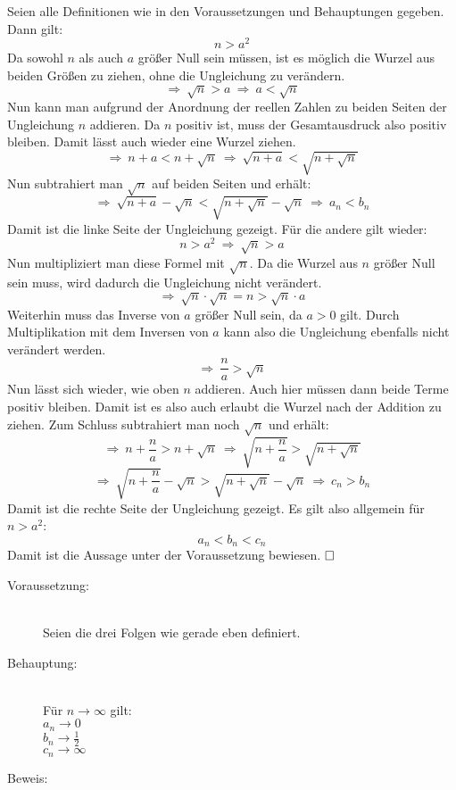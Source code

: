 \documentclass[10pt, a4paper]{article}
\begin{document}
		Seien alle Definitionen wie in den Voraussetzungen und Behauptungen gegeben. Dann gilt:
		\[
			n > a^2
		\]
		Da sowohl $n$ als auch $a$ größer Null sein müssen, ist es möglich die Wurzel aus beiden Größen zu ziehen, ohne die Ungleichung zu verändern.
		\[
			\Rightarrow \ \sqrt{n} > a \ \Rightarrow \ a < \sqrt{n}
		\]
		Nun kann man aufgrund der Anordnung der reellen Zahlen zu beiden Seiten der Ungleichung $n$ addieren. Da $n$ positiv ist, muss der Gesamtausdruck also positiv bleiben. Damit lässt auch wieder eine Wurzel ziehen.
		\[
			\Rightarrow \ n+a < n+\sqrt{n} \ \Rightarrow  \ \sqrt{n+a} < \sqrt{n+\sqrt{n}}
		\]
		Nun subtrahiert man $\sqrt{n}$ auf beiden Seiten und erhält:
		\[
			\Rightarrow \ \sqrt{n+a} - \sqrt{n} < \sqrt{n+\sqrt{n}} - \sqrt{n} \ \Rightarrow \ a_n < b_n
		\]
		Damit ist die linke Seite der Ungleichung gezeigt. Für die andere gilt wieder:
		\[
			n > a^2 \ \Rightarrow \ \sqrt{n} > a
		\]
		Nun multipliziert man diese Formel mit $\sqrt{n}$. Da die Wurzel aus $n$ größer Null sein muss, wird dadurch die Ungleichung nicht verändert.
		\[
			\Rightarrow \ \sqrt{n}\cdot\sqrt{n} = n > \sqrt{n}\cdot a
		\]
		Weiterhin muss das Inverse von $a$ größer Null sein, da $a>0$ gilt. Durch Multiplikation mit dem Inversen von $a$ kann also die Ungleichung ebenfalls nicht verändert werden.
		\[
			\Rightarrow \ \dfrac{n}{a} > \sqrt{n}
		\]
		Nun lässt sich wieder, wie oben $n$ addieren. Auch hier müssen dann beide Terme positiv bleiben. Damit ist es also auch erlaubt die Wurzel nach der Addition zu ziehen. Zum Schluss subtrahiert man noch $\sqrt{n}$ und erhält:
		\[
			\Rightarrow \ n+\dfrac{n}{a} > n + \sqrt{n} \ \Rightarrow \ \sqrt{n+\dfrac{n}{a}} > \sqrt{n + \sqrt{n}}
		\]
		\[
			\Rightarrow \ \sqrt{n+\dfrac{n}{a}} - \sqrt{n} > \sqrt{n + \sqrt{n}} - \sqrt{n} \ \Rightarrow \ c_n > b_n
		\]
		Damit ist die rechte Seite der Ungleichung gezeigt.
		Es gilt also allgemein für $n > a^2$:
		\[
			a_n < b_n < c_n
		\]
		Damit ist die Aussage unter der Voraussetzung bewiesen. $\hfill\Box$ \\

		\begin{description}
			\item[Voraussetzung:] \hfill \\
				Seien die drei Folgen wie gerade eben definiert.
			\item[Behauptung:] \hfill \\
				Für $ n\rightarrow \infty$ gilt: \\
				$a_n\rightarrow 0$ \\
				$b_n\rightarrow \frac{1}{2}$\\
				$c_n\rightarrow \infty$
			\item[Beweis:]
		\end{description}
		
\end{document}

